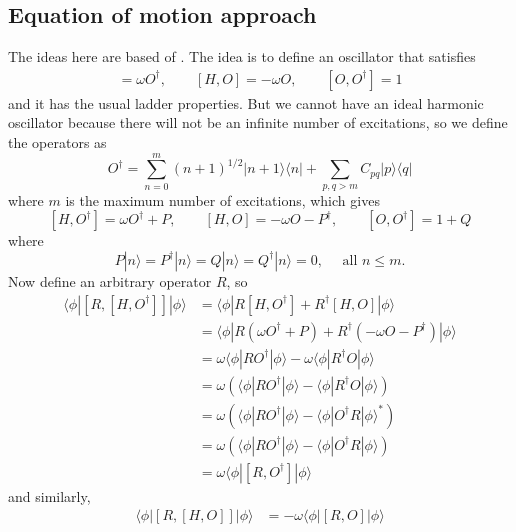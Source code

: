 \subsection{Equation of motion approach}
The ideas here are based of \cite{rowe1968equations}. The idea is to define an oscillator that satisfies
\begin{align}
    [H, O^\dag] = \omega O^\dag , \quad  \quad [H, O] = -\omega O , \quad \quad [O, O^\dag] = 1
\end{align}
and it has the usual ladder properties. But we cannot have an ideal harmonic oscillator because there will not be an infinite number of excitations, so we define the operators as
\begin{equation}
O^{\dagger}=\sum_{n=0}^m(n+1)^{1 / 2}|n+1\rangle\langle n|+\sum_{p, q>m} C_{p q}|p\rangle\langle q|
\end{equation}
where $m$ is the maximum number of excitations,
which gives 
\begin{equation}
{\left[H, O^{\dagger}\right] } =\omega O^{\dagger}+P, \quad \quad
{[H, O] } =-\omega O-P^{\dagger}, \quad \quad [O, O^{\dagger}] = 1+Q
\end{equation}
where
$$
P|n\rangle=P^\dag|n\rangle=Q|n\rangle=Q^{\dagger}|n\rangle=0, \quad \text { all } n \leq m .
$$
Now define an arbitrary operator $R$, so
\begin{align}
    \langle \phi | [R,[H, O^\dagger]] | \phi \rangle 
    &= \langle \phi | R[H, O^\dagger] + R^\dagger[H, O] | \phi \rangle \\
    &= \langle \phi | R(\omega O^\dagger + P) + R^\dagger(-\omega O - P^\dagger) | \phi \rangle \\
    &= \omega \langle \phi | R O^\dagger | \phi \rangle - \omega \langle \phi | R^\dagger O | \phi \rangle \\
    &= \omega \left( \langle \phi | R O^\dagger | \phi \rangle - \langle \phi | R^\dagger O | \phi \rangle \right) \\
    &= \omega \left( \langle \phi | R O^\dagger | \phi \rangle - \langle \phi | O^\dagger R | \phi \rangle^* \right) \\
    &= \omega \left( \langle \phi | R O^\dagger | \phi \rangle - \langle \phi | O^\dagger R | \phi \rangle
 \right) \\
    &= \omega \langle \phi | [R, O^\dagger] | \phi \rangle
\end{align}
and similarly,
\begin{align}
    \langle \phi | [R,[H, O]] | \phi \rangle 
    &= -\omega \langle \phi | [R, O] | \phi \rangle
\end{align}
